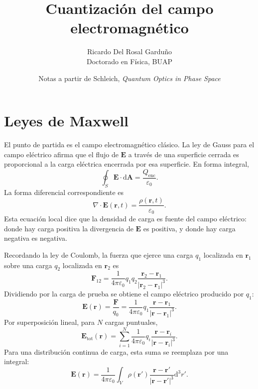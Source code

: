 \documentclass[11pt]{article}
\title{Cuantizaci\'on del campo electromagn\'etico}
\author{Ricardo Del Rosal Gardu\~no \\ \small Doctorado en F\'isica, BUAP}
\date{Notas a partir de Schleich, \emph{Quantum Optics in Phase Space}}
\newcommand{\dd}{\mathrm{d}}
\newcommand{\vb}[1]{\mathbf{#1}}
\begin{document}
\maketitle

\section{Leyes de Maxwell}

El punto de partida es el campo electromagn\'etico cl\'asico. La ley de Gauss
para el campo el\'ectrico afirma que el flujo de $\vb E$ a trav\'es de una
superficie cerrada es proporcional a la carga el\'ectrica encerrada por esa
superficie. En forma integral,
\begin{equation}
  \oint_S \vb E\cdot \dd\vb A
  =
  \frac{Q_{\mathrm{enc}}}{\varepsilon_0}.
\end{equation}
La forma diferencial correspondiente es
\begin{equation}
  \nabla\cdot \vb E(\vb r,t)
  =
  \frac{\rho(\vb r,t)}{\varepsilon_0}.
\end{equation}
Esta ecuaci\'on local dice que la densidad de carga es fuente del campo
el\'ectrico: donde hay carga positiva la divergencia de $\vb E$ es positiva,
y donde hay carga negativa es negativa.

Recordando la ley de Coulomb, la fuerza que ejerce una carga $q_1$ localizada
en $\vb r_1$ sobre una carga $q_2$ localizada en $\vb r_2$ es
\begin{equation}
  \vb F_{12}
  =
  \frac{1}{4\pi\varepsilon_0}
  q_1q_2
  \frac{\vb r_2-\vb r_1}{|\vb r_2-\vb r_1|^3}.
\end{equation}
Dividiendo por la carga de prueba se obtiene el campo el\'ectrico producido
por $q_1$:
\begin{equation}
  \vb E(\vb r)
  =
  \frac{\vb F}{q_0}
  =
  \frac{1}{4\pi\varepsilon_0}
  q_1
  \frac{\vb r-\vb r_1}{|\vb r-\vb r_1|^3}.
\end{equation}
Por superposici\'on lineal, para $N$ cargas puntuales,
\begin{equation}
  \vb E_{\mathrm{tot}}(\vb r)
  =
  \sum_{i=1}^N
  \frac{1}{4\pi\varepsilon_0}
  q_i
  \frac{\vb r-\vb r_i}{|\vb r-\vb r_i|^3}.
\end{equation}
Para una distribuci\'on continua de carga, esta suma se reemplaza por una
integral:
\begin{equation}
  \vb E(\vb r)
  =
  \frac{1}{4\pi\varepsilon_0}
  \int_V
  \rho(\vb r')
  \frac{\vb r-\vb r'}{|\vb r-\vb r'|^3}
  \dd^3r'.
\end{equation}
\end{document}
